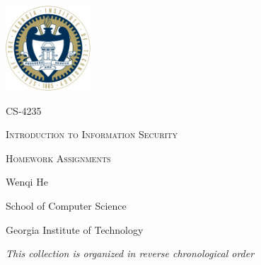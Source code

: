 \documentclass[10pt]{article}
\begin{document}
\begin{titlepage}
	\centering
	\par
	\vspace{5cm}
	\includegraphics[width=120px]{logo.png}\par
	\vspace{3cm}
	{\scshape\Large CS-4235\par}
	{\Huge\scshape Introduction to Information Security \par}
	\vspace{0.3cm}
	{\scshape\LARGE Homework Assignments \par}
	\vspace{2cm}
	\vfill
	{\Large Wenqi He\par}
	\vspace{0.3cm}
	{\Large School of Computer Science\par}	
	\vspace{0.3cm}
	{\Large Georgia Institute of Technology \par}
	\vfill
	{\large\itshape This collection is organized in reverse chronological order}
\end{titlepage}
\end{document}
